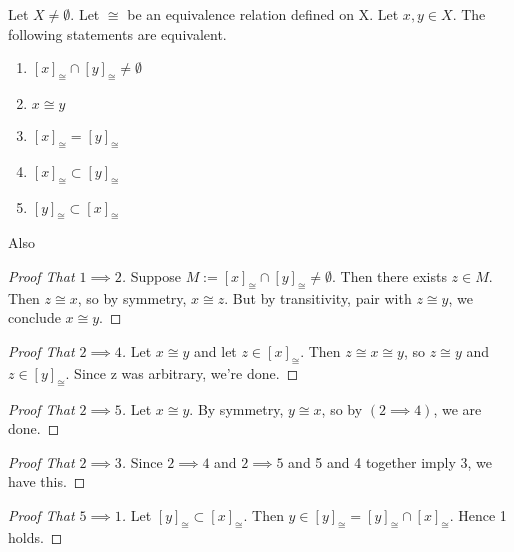 \begin{prop}
    \label{prop:EquivalenceClassesPartition}
    
    Let $X \neq \emptyset$. 
    Let $\cong$ be an equivalence relation defined on X. 
    Let $x,y \in X$. 
    The following statements are equivalent. 
    \begin{enumerate}
        \item $[x]_{\cong}  \cap [y]_{\cong} \neq \emptyset$
        \item $x \cong y$
        \item $[x]_{\cong} = [y]_{\cong}$
        \item $[x]_{\cong} \subset [y]_{\cong}$
        \item $[y]_{\cong} \subset [x]_{\cong}$ 
    \end{enumerate}
    
    Also
\begin{proof}[Proof That $1 \implies 2$]
Suppose $M:=[x]_{\cong} \cap [y]_{\cong} \neq \emptyset$. 
Then there exists $z \in M$.
Then $z \cong x$, so by symmetry, $x \cong z$. 
But by transitivity, pair with $z \cong y$, we conclude $x \cong y$. 
\end{proof}
\begin{proof}[Proof That $2 \implies 4$]
    Let $x \cong y$ and let $z \in [x]_{\cong}$. 
    Then $z \cong x \cong y$, so $z \cong y$ and $z \in [y]_{\cong}$.
    Since z was arbitrary, we're done. 
\end{proof}
\begin{proof}[Proof That $2 \implies 5$]
    Let $x \cong y$. By symmetry, $y \cong x$, so by $(2 \implies 4)$, we are done. 
\end{proof}
\begin{proof}[Proof That $2 \implies 3$]
    Since  $2 \implies 4$ and $2 \implies 5$ and 5 and 4 together imply 3, we have this. 
\end{proof}
\begin{proof}[Proof That $5 \implies 1$]
    Let $[y]_{\cong} \subset [x]_{\cong}$. 
    Then $y \in [y]_{\cong} = [y]_{\cong} \cap [x]_{\cong} $.
    Hence 1 holds. 
\end{proof}

\end{prop} 